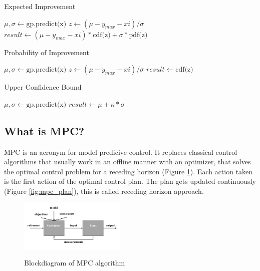 \documentclass[twoside,twocolumn]{article}
\begin{document}
\begin{algorithm}
    \caption{Expected Improvement}
    \label{alg:ei}
    \begin{algorithmic}
        \State $\mu, \sigma \gets \text{gp.predict(x)}$
        \State $z \gets (\mu - y_{max} - xi)/\sigma$
        \State $result \gets (\mu - y_{max} - xi) * \text{cdf(z)} + \sigma * \text{pdf(z)}$
    \end{algorithmic}
\end{algorithm}

\begin{algorithm}
    \caption{Probability of Improvement}
    \label{alg:poi}
    \begin{algorithmic}
        \State $\mu, \sigma \gets \text{gp.predict(x)}$
        \State $z \gets (\mu - y_{max} - xi)/\sigma$
        \State $result \gets \text{cdf(z)}$
    \end{algorithmic}
\end{algorithm}

\begin{algorithm}
    \caption{Upper Confidence Bound}
    \label{alg:ucb}
    \begin{algorithmic}
        \State $\mu, \sigma \gets \text{gp.predict(x)}$
        \State $result \gets \mu + \kappa * \sigma$
    \end{algorithmic}
\end{algorithm}

\subsection{What is MPC?}
MPC is an acronym for model predicive control.
It replaces classical control algorithms that usually work in an offline manner with an optimizer, that solves the optimal control problem for a receding horizon (Figure \ref{fig:mpc}).
Each action taken is the first action of the optimal control plan.
The plan gets updated continuously (Figure \ref{fig:mpc_plan}), this is called receding horizon approach.

\begin{figure}[h]
    \caption{Blockdiagram of MPC algorithm}
    \centering
    \includegraphics[width=0.45\textwidth]{fig_mpc.pdf}
    \label{fig:mpc}
\end{figure}
\end{document}
